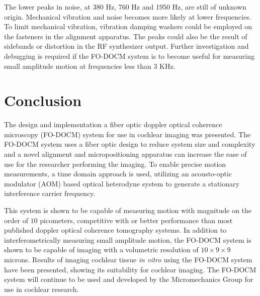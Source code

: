 The lower peaks in noise, at 380 Hz, 760 Hz and 1950 Hz, are still of unknown origin. Mechanical vibration and noise becomes more likely at lower frequencies. To limit mechanical vibration, vibration damping washers could be employed on the fasteners in the alignment apparatus. The peaks could also be the result of sidebands or distortion in the RF synthesizer output. Further investigation and debugging is required if the FO-DOCM system is to become useful for measuring small amplitude motion at frequencies less than 3 KHz.


\section{Conclusion}

The design and implementation a fiber optic doppler optical coherence microscopy (FO-DOCM) system for use in cochlear imaging was presented. The FO-DOCM system uses a fiber optic design to reduce system size and complexity and a novel alignment and micropositioning apparatus can increase the ease of use for the researcher performing the imaging. To enable precise motion measurements, a time domain approach is used, utilizing an acousto-optic modulator (AOM) based optical heterodyne system to generate a stationary interference carrier frequency.

This system is shown to be capable of measuring motion with magnitude on the order of $10$ picometers, competitive with or better performance than most published doppler optical coherence tomography systems. In addition to interferometrically measuring small amplitude motion, the FO-DOCM system is shown to be capable of imaging with a volumetric resolution of $10 \times 9 \times 9$ microns. Results of imaging cochlear tissue {\em in vitro} using the FO-DOCM system have been presented, showing its suitability for cochlear imaging. The FO-DOCM system will continue to be used and developed by the Micromechanics Group for use in cochlear research.
